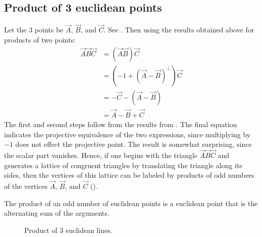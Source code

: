 \documentclass[12pt]{article}
\newcommand{\mydogblue}{{\color{gray} $\square$~~}}
\begin{document}
 \subsection{Product of 3 euclidean points}
 Let the 3 points be $\vec{A}$, $\vec{B}$, and $\vec{C}$. See . Then using the results obtained above for products of two points:
 \begin{align*}
 \vec{A}\vec{B}\vec{C} &= (\vec{A} \vec{B})\vec{C} \\
 &= (-1 + (\vec{A} - \vec{B})^{\perp}) \vec{C} \\
 &= -\vec{C} - (\vec{A}-\vec{B}) \\
 &= \vec{A} -\vec{B} +\vec{C}
 \end{align*}
 The first and second steps follow from the results from .  The final equation indicates the projective equivalence of the two expressions, since multiplying by $-1$ does not effect the projective point.  The result is somewhat surprising, since the scalar part vanishes.  
 Hence, if one begins with the triangle $\vec{A}\vec{B}\vec{C}$ and generates a lattice of congruent triangles by translating the triangle along its sides, then the vertices of this lattice can be labeled by products of odd numbers of the vertices $\vec{A}$, $\vec{B}$, and $\vec{C}$ ().

 \myexercise  
 The product of an odd number of euclidean points is  a euclidean point that is the alternating sum of the arguments. %
 
  \begin{figure}[b]
   \centering
{\setlength\fboxsep{0pt}}
\caption{Product of 3 euclidean lines.}
\label{fig:trianglelns}
\end{figure}
\end{document}
